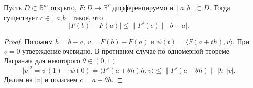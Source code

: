 \label{ticket:06}

\begin{theorem}
Пусть $D\subset\mathbb R^m$ открыто, $F:D\to\mathbb R^\ell$ дифференцируемо и $[a,b]\subset D$.
Тогда существует $c\in[a,b]$ такое, что
\[
  |F(b)-F(a)|\le\|F'(c)\|\,|b-a|.
\]
\end{theorem}

\begin{proof}
Положим $h=b-a$, $v=F(b)-F(a)$ и $\psi(t)=\langle F(a+th),v\rangle$.
При $v=0$ утверждение очевидно.
В противном случае по одномерной теореме Лагранжа для некоторого $\theta\in(0,1)$
\[
  |v|^2=\psi(1)-\psi(0)
        =\langle F'(a+\theta h)h,v\rangle
        \le\|F'(a+\theta h)\|\,|h|\,|v|.
\]
Делим на $|v|$ и полагаем $c=a+\theta h$.
\end{proof}
